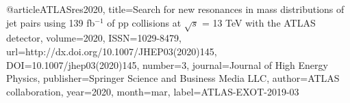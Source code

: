 @article{ATLASres2020, 
    title={Search for new resonances in mass distributions of jet pairs using 139 fb$^{-1}$ of pp collisions at $ \sqrt{s} $ = 13 TeV with the ATLAS detector}, 
    volume={2020}, 
    ISSN={1029-8479}, 
    url={http://dx.doi.org/10.1007/JHEP03(2020)145}, 
    DOI={10.1007/jhep03(2020)145}, 
    number={3}, 
    journal={Journal of High Energy Physics}, 
    publisher={Springer Science and Business Media LLC}, 
    author={ATLAS collaboration}, 
    year={2020}, 
    month=mar,
    label={ATLAS-EXOT-2019-03}
}

